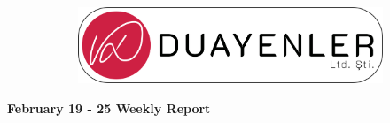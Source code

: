 \documentclass[a4paper,12pt]{article}
\begin{document}
	
\begin{figure}
	\vspace*{-.7cm}
	\centering
	\begin{figure}[H]
		\centering
		\setlength{\unitlength}{\textwidth} 
		\includegraphics[width=0.9\unitlength]{../../../documents/logos/logo3-with-stroke}
	\end{figure}
\end{figure}
\vspace*{-1.7cm}
\begin{center}
	\Large\textbf{February 19 - 25 Weekly Report}
	\end{center}
\end{document}
